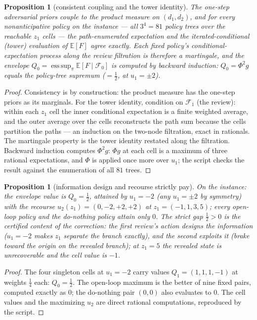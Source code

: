 \documentclass[10pt,twocolumn]{article}
\theoremstyle{plain}
\newtheorem{proposition}[theorem]{Proposition}
\theoremstyle{definition}
\theoremstyle{remark}
\begin{document}
\begin{proposition}[consistent coupling and the tower identity]
\label{dual-prop:tower}
The one-step adversarial priors couple to the product measure on
$(d_1, d_2)$, and for \emph{every} nonanticipative policy on the instance
--- all $3^{4} = 81$ policy trees over the reachable $z_1$ cells --- the
path-enumerated expectation and the iterated-conditional (tower)
evaluation of $\mathbb{E}[F]$ agree exactly. Each fixed policy's
conditional-expectation process along the review filtration is therefore
a martingale, and the envelope
$Q_0 = \operatorname*{ess\,sup}_{\pi} \mathbb{E}[F \mid \mathcal{F}_0]$
is computed by backward induction: $Q_0 = \Phi^{2} g$ equals the
policy-tree supremum ($= \tfrac{1}{2}$, at $u_1 = \pm 2$).
\end{proposition}
\begin{proof}
Consistency is by construction: the product measure has the one-step
priors as its marginals. For the tower identity, condition on
$\mathcal{F}_1$ (the review): within each $z_1$ cell the inner
conditional expectation is a finite weighted average, and the outer
average over the cells reconstructs the path sum because the cells
partition the paths --- an induction on the two-node filtration, exact
in rationals. The martingale property is the tower identity restated
along the filtration. Backward induction computes
$\Phi^{2} g$: $\Phi g$ at each cell is a maximum of three rational
expectations, and $\Phi$ is applied once more over $u_1$; the script
checks the result against the enumeration of all $81$ trees.
\end{proof}

\begin{proposition}[information design and recourse strictly pay]
\label{dual-prop:strict}
On the instance: the envelope value is $Q_0 = \tfrac{1}{2}$, attained by
$u_1 = -2$ (any $u_1 = \pm 2$ by symmetry) with the recourse
$u_2(z_1) = (0, -2, +2, +2)$ at $z_1 = (-1, 1, 3, 5)$; every open-loop
policy and the do-nothing policy attain only $0$. The strict gap
$\tfrac{1}{2} > 0$ is the certified content of the correction: the first
review's action \emph{designs the information} ($u_1 = -2$ makes $z_1$
separate the branch exactly), and the second \emph{exploits it}
(brake toward the origin on the revealed branch); at $z_1 = 5$ the
revealed state is unrecoverable and the cell value is $-1$.
\end{proposition}
\begin{proof}
The four singleton cells at $u_1 = -2$ carry values
$Q_1 = (1, 1, 1, -1)$ at weights $\tfrac{1}{4}$ each: $Q_0 = \tfrac12$.
The open-loop maximum is the better of nine fixed pairs, computed
exactly as $0$; the do-nothing pair $(0,0)$ also evaluates to $0$.
The cell values and the maximizing $u_2$ are direct rational
computations, reproduced by the script.
\end{proof}
\end{document}
